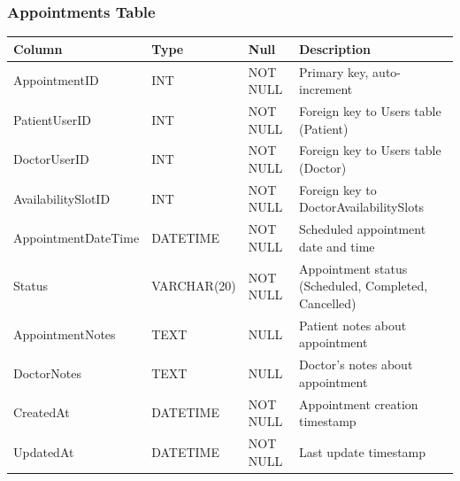 \documentclass[12pt,a4paper]{article}
\begin{document}
\subsubsection{Appointments Table}
\begin{longtable}{|p{3cm}|p{2cm}|p{2cm}|p{7cm}|}
\hline
\textbf{Column} & \textbf{Type} & \textbf{Null} & \textbf{Description} \\
\hline
AppointmentID & INT & NOT NULL & Primary key, auto-increment \\
\hline
PatientUserID & INT & NOT NULL & Foreign key to Users table (Patient) \\
\hline
DoctorUserID & INT & NOT NULL & Foreign key to Users table (Doctor) \\
\hline
AvailabilitySlotID & INT & NOT NULL & Foreign key to DoctorAvailabilitySlots \\
\hline
AppointmentDateTime & DATETIME & NOT NULL & Scheduled appointment date and time \\
\hline
Status & VARCHAR(20) & NOT NULL & Appointment status (Scheduled, Completed, Cancelled) \\
\hline
AppointmentNotes & TEXT & NULL & Patient notes about appointment \\
\hline
DoctorNotes & TEXT & NULL & Doctor's notes about appointment \\
\hline
CreatedAt & DATETIME & NOT NULL & Appointment creation timestamp \\
\hline
UpdatedAt & DATETIME & NOT NULL & Last update timestamp \\
\hline
\end{longtable}
\end{document}
